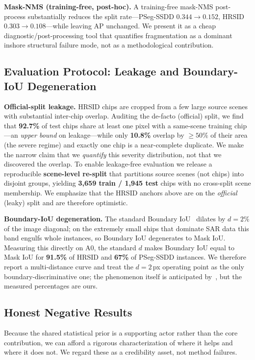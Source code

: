 \textbf{Mask-NMS (training-free, post-hoc).} A training-free mask-NMS post-process substantially reduces the split rate---PSeg-SSDD $0.344\!\rightarrow\!0.152$, HRSID $0.303\!\rightarrow\!0.108$---while leaving AP unchanged. We present it as a cheap diagnostic/post-processing tool that quantifies fragmentation as a dominant inshore structural failure mode, not as a methodological contribution.

\subsection{Evaluation Protocol: Leakage and Boundary-IoU Degeneration}
\label{ssec:protocol}
\textbf{Official-split leakage.} HRSID chips are cropped from a few large source scenes with substantial inter-chip overlap. Auditing the de-facto (official) split, we find that \textbf{92.7\%} of test chips share at least one pixel with a same-scene training chip---an \emph{upper bound} on leakage---while only \textbf{10.8\%} overlap by $\ge50\%$ of their area (the severe regime) and exactly one chip is a near-complete duplicate. We make the narrow claim that we \emph{quantify} this severity distribution, not that we discovered the overlap. To enable leakage-free evaluation we release a reproducible \textbf{scene-level re-split} that partitions source scenes (not chips) into disjoint groups, yielding \textbf{3{,}659 train / 1{,}945 test} chips with no cross-split scene membership. We emphasize that the HRSID anchors above are on the \emph{official} (leaky) split and are therefore optimistic.

\textbf{Boundary-IoU degeneration.} The standard Boundary IoU~\cite{cheng2021boundary} dilates by $d=2\%$ of the image diagonal; on the extremely small ships that dominate SAR data this band engulfs whole instances, so Boundary IoU degenerates to Mask IoU. Measuring this directly on A0, the standard $d$ makes Boundary IoU equal to Mask IoU for \textbf{91.5\%} of HRSID and \textbf{67\%} of PSeg-SSDD instances. We therefore report a multi-distance curve and treat the $d=2$\,px operating point as the only boundary-discriminative one; the phenomenon itself is anticipated by~\cite{cheng2021boundary}, but the measured percentages are ours.

\subsection{Honest Negative Results}
\label{ssec:negatives}
Because the shared statistical prior is a supporting actor rather than the core contribution, we can afford a rigorous characterization of where it helps and where it does not. We regard these as a credibility asset, not method failures.

